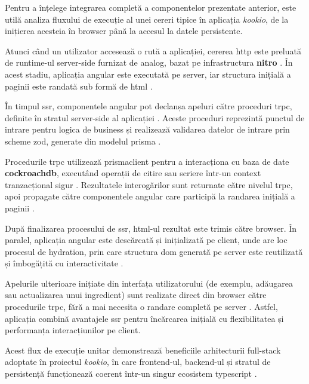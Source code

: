 Pentru a înțelege integrarea completă a componentelor prezentate anterior, este utilă analiza fluxului de execuție al unei cereri tipice în aplicația \textit{\gls{kookio}}, de la inițierea acesteia în browser până la accesul la datele persistente.

Atunci când un utilizator accesează o rută a aplicației, cererea \acrshort{http} este preluată de runtime-ul server-side furnizat de \gls{analog}, bazat pe infrastructura \textbf{\gls{nitro}} \cite{analog,nitro}.
În acest stadiu, aplicația \gls{angular} este executată pe server, iar structura inițială a paginii este randată sub formă de \acrshort{html} \cite{analog}.

În timpul \acrlong{ssr}, componentele \gls{angular} pot declanșa apeluri către proceduri \acrshort{trpc}, definite în stratul server-side al aplicației \cite{trpc}.
Aceste proceduri reprezintă punctul de intrare pentru logica de business și realizează validarea datelor de intrare prin scheme \gls{zod}, generate din modelul \gls{prisma} \cite{zod,prisma,prisma_zod_generator}.

Procedurile \acrshort{trpc} utilizează \gls{prismaclient} pentru a interacționa cu baza de date \textbf{\gls{cockroachdb}}, executând operații de citire sau scriere într-un context tranzacțional sigur \cite{prisma,cockroachdb}.
Rezultatele interogărilor sunt returnate către nivelul \acrshort{trpc}, apoi propagate către componentele \gls{angular} care participă la randarea inițială a paginii \cite{trpc}.

După finalizarea procesului de \acrlong{ssr}, \acrshort{html}-ul rezultat este trimis către browser.
În paralel, aplicația \gls{angular} este descărcată și inițializată pe client, unde are loc procesul de \gls{hydration}, prin care structura \acrshort{dom} generată pe server este reutilizată și îmbogățită cu interactivitate \cite{analog}.

Apelurile ulterioare inițiate din interfața utilizatorului (de exemplu, adăugarea sau actualizarea unui ingredient) sunt realizate direct din browser către procedurile \acrshort{trpc}, fără a mai necesita o \gls{randare} completă pe server \cite{trpc}.
Astfel, aplicația combină avantajele \acrlong{ssr} pentru încărcarea inițială cu flexibilitatea și performanța interacțiunilor pe client.

Acest flux de execuție unitar demonstrează beneficiile arhitecturii full-stack adoptate în proiectul \textit{\gls{kookio}}, în care \gls{frontend}-ul, \gls{backend}-ul și stratul de persistență funcționează coerent într-un singur ecosistem \gls{typescript} \cite{nx,analog,trpc,prisma}.

